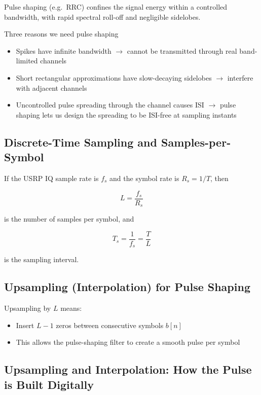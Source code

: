 Pulse shaping (e.g.\ RRC) confines the signal energy within a controlled bandwidth, with rapid spectral roll-off and negligible sidelobes.

\begin{KeyBox}{Three reasons we need pulse shaping}
\begin{itemize}
\item Spikes have infinite bandwidth $\rightarrow$ cannot be transmitted through real band-limited channels
\item Short rectangular approximations have slow-decaying sidelobes $\rightarrow$ interfere with adjacent channels
\item Uncontrolled pulse spreading through the channel causes ISI $\rightarrow$ pulse shaping lets us design the spreading to be ISI-free at sampling instants
\end{itemize}
\end{KeyBox}

\subsection{Discrete-Time Sampling and Samples-per-Symbol}

If the USRP IQ sample rate is $f_s$ and the symbol rate is $R_s=1/T$, then

\begin{equation}
L=\frac{f_s}{R_s}
\label{eq:L}
\end{equation}

is the number of samples per symbol, and

\begin{equation}
T_s=\frac{1}{f_s}=\frac{T}{L}
\label{eq:Ts}
\end{equation}

is the sampling interval.

\subsection{Upsampling (Interpolation) for Pulse Shaping}

Upsampling by $L$ means:

\begin{itemize}
\item Insert $L-1$ zeros between consecutive symbols $b[n]$
\item This allows the pulse-shaping filter to create a smooth pulse per symbol
\end{itemize}

\subsection{Upsampling and Interpolation: How the Pulse is Built Digitally}
\label{sec:interpolation}

